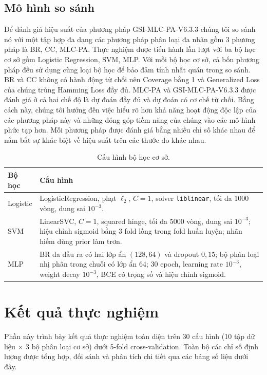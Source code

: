 \documentclass[11pt,a4paper]{article}
\begin{document}
\subsection{Mô hình so sánh}

Để đánh giá hiệu suất của phương pháp GSI-MLC-PA-V6.3.3 chúng tôi so sánh nó với một tập hợp đa dạng các phương pháp phân loại đa nhãn gồm 3 phương pháp là BR, CC, MLC-PA. Thực nghiệm được tiến hành lần lượt với ba bộ học cơ sở gồm Logistic Regression, SVM, MLP. Với mỗi bộ học cơ sở, cả bốn phương pháp đều sử dụng cùng loại bộ học để bảo đảm tính nhất quán trong so sánh. BR và CC không có hành động từ chối nên Coverage bằng 1 và Generalized Loss của chúng trùng Hamming Loss đầy đủ. MLC-PA và GSI-MLC-PA-V6.3.3 được đánh giá ở cả hai chế độ là dự đoán đầy đủ và dự đoán có cơ chế từ chối. Bằng cách này, chúng tôi hướng đến việc hiểu rõ hơn khả năng hoạt động độc lập của các phương pháp này và những đóng góp tiềm năng của chúng vào các mô hình phức tạp hơn. Mỗi phương pháp được đánh giá bằng nhiều chỉ số khác nhau để nắm bắt sự khác biệt về hiệu suất trên các thước đo khác nhau.

\begin{table}[h]
\centering
\caption{Cấu hình bộ học cơ sở.}
\label{tab:base-learners}
\small
\begin{tabularx}{\textwidth}{lX}
\toprule
Bộ học & Cấu hình \\
\midrule
Logistic & LogisticRegression, phạt $\ell_2$, $C=1$, solver \texttt{liblinear}, tối đa 1000 vòng, dung sai $10^{-3}$. \\
SVM & LinearSVC, $C=1$, squared hinge, tối đa 5000 vòng, dung sai $10^{-3}$; hiệu chỉnh sigmoid bằng 3 fold lồng trong fold huấn luyện; nhãn hiếm dùng prior làm trơn. \\
MLP & BR đa đầu ra có hai lớp ẩn $(128,64)$ và dropout $0{,}15$; bộ phân loại nhị phân trong chuỗi có lớp ẩn 64; 30 epoch, learning rate $10^{-3}$, weight decay $10^{-3}$, BCE có trọng số và hiệu chỉnh sigmoid. \\
\bottomrule
\end{tabularx}
\end{table}


\section{Kết quả thực nghiệm}

Phần này trình bày kết quả thực nghiệm toàn diện trên 30 cấu hình (10 tập dữ liệu $\times$ 3 bộ phân loại cơ sở) dưới 5-fold cross-validation. Toàn bộ các chỉ số định lượng được tổng hợp, đối sánh và phân tích chi tiết qua các bảng số liệu dưới đây.
\end{document}

